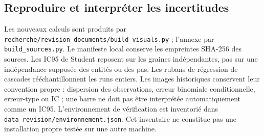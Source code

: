 \subsection{Reproduire et interpréter les incertitudes}
Les nouveaux calculs sont produits par \texttt{recherche/revision\_documents/build\_visuals.py} ;
l'annexe par \texttt{build\_sources.py}. Le manifeste local conserve les empreintes SHA-256 des sources.
Les IC95 de Student reposent sur les graines indépendantes, pas sur une indépendance
supposée des entités ou des pas. Les rubans de régression de cascades rééchantillonnent
les runs entiers. Les images historiques conservent leur convention propre :
dispersion des observations, erreur binomiale conditionnelle, erreur-type ou IC ;
une barre ne doit pas être interprétée automatiquement comme un IC95.
L'environnement de vérification est inventorié dans \texttt{data\_revision/environnement.json}.
Cet inventaire ne constitue pas une installation propre testée sur une autre machine.
